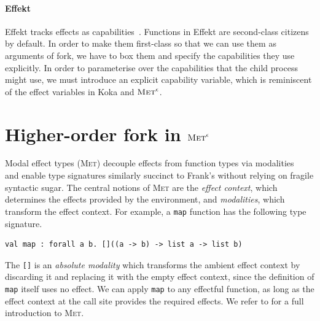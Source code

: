 \documentclass[sigplan, nonacm, natbib = false, review, screen]{acmart}
\newcommand{\Met}{\textsc{Met}\xspace}
\newcommand{\MetVar}{$\Met^\epsilon$\xspace}
\begin{document}
\paragraph{Effekt}
Effekt tracks effects as capabilities~\cite{effekt2020,
effekt2022}.
%
%
Functions in Effekt are second-class citizens by default.
%
In order to make them first-class so that we can use them as arguments
of \textsf{fork}, we have to box them and specify the capabilities
they use explicitly.
%
In order to parameterise over the capabilities that the child process
might use, we must introduce an explicit capability variable, which
is reminiscent of the effect variables in Koka and \MetVar.

\section{Higher-order fork in \MetVar}
\label{sec:met}

Modal effect types (\textsc{Met}) decouple effects from function types
via modalities~\cite{tang2025modal, tang2026modal} and enable type
signatures similarly succinct to Frank's without relying on fragile
syntactic sugar.
%
The central notions of \textsc{Met} are the \emph{effect context}, which
determines the effects provided by the environment, and
\emph{modalities}, which transform the effect context.
%
For example, a \lstinline{map} function has the following type
signature.
%
\begin{lstlisting}[style=metl]
  val map : forall a b. []((a -> b) -> list a -> list b)
\end{lstlisting}
%
The \lstinline{[]} is an \emph{absolute modality} which transforms the ambient effect context by discarding it and replacing it with the empty effect context, since
the definition of \lstinline{map} itself uses no effect.
%
%
%
We can apply \lstinline{map} to any effectful function, as long as the
effect context at the call site provides the required effects.
%
We refer to \cite{tang2025modal, tang2026modal} for a full
introduction to \textsc{Met}.
\end{document}
